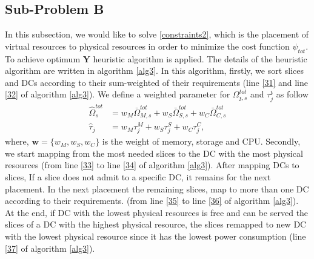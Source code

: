 \documentclass[conference]{IEEEtran}
\begin{document}
\subsection{Sub-Problem B}
In this subsection, we would like to solve  \eqref{constraints2}, which is the placement of virtual resources to physical resources in order to minimize the cost function $\psi_{tot}$.
To achieve optimum $\boldsymbol{Y}$ heuristic algorithm is applied. The details of the heuristic algorithm are written in algorithm \eqref{alg3}. In this algorithm, firstly, we sort slices and DCs according to their sum-weighted of their requirements (line \ref{31} and line \ref{32} of algorithm \ref{alg3}).
We define a weighted parameter for $\Omega_{\mathfrak{z},s}^{tot}$ and $\tau_j^\mathfrak{z}$ as follow
\begin{equation}\label{wt}
\begin{split}
\hat{\Omega}_{s}^{tot} &= w_M \bar{\Omega}_{M,s}^{tot} + w_S \bar{\Omega}_{S,s}^{tot} + w_C \bar{\Omega}_{C,s}^{tot} \\
\hat{\tau}_j &= w_M \tau_{{j}}^M + w_S \tau_{{j}}^S + w_C \tau_{{j}}^C,
\end{split}
\end{equation}
where, $\boldsymbol{w} = \{w_M, w_S, w_C\}$ is the weight of memory, storage and CPU.
Secondly, we start mapping from the most needed slices to the DC with the most physical resources (from line \ref{33} to line \ref{34} of algorithm \ref{alg3}). After mapping DCs to slices, If a slice does not admit to a specific DC, it remains for the next placement. In the next placement the remaining slices, map to more than one DC according to their requirements. (from line \ref{35} to line \ref{36} of algorithm \ref{alg3}). At the end, if DC with the lowest physical resources is free and can be served the slices of a DC with the highest physical resource, the slices remapped to new DC with the lowest physical resource since it has the lowest power consumption (line \ref{37} of algorithm \ref{alg3}).
\end{document}
